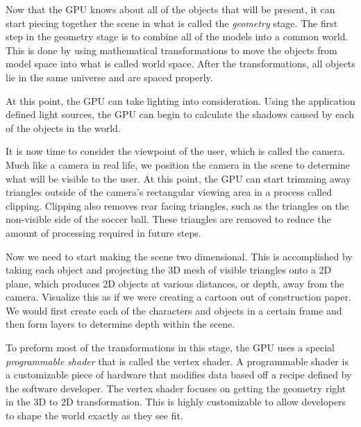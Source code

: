 \documentclass[12pt] {article}
\begin{document}
Now that the GPU knows about all of the objects that will be present, it can start piecing together the scene in what is called the \emph{geometry} stage. The first step in the geometry stage is to combine all of the models into a common world. This is done by using mathematical transformations to move the objects from model space into what is called world space. After the transformations, all objects lie in the same universe and are spaced properly. 

At this point, the GPU can take lighting into consideration. Using the application defined light sources, the GPU can begin to calculate the shadows caused by each of the objects in the world.

It is now time to consider the viewpoint of the user, which is called the camera. Much like a camera in real life, we position the camera in the scene to determine what will be visible to the user. At this point, the GPU can start trimming away triangles outside of the camera's rectangular viewing area in a process called clipping. Clipping also removes rear facing triangles, such as the triangles on the non-visible side of the soccer ball. These triangles are removed to reduce the amount of processing required in future steps.

Now we need to start making the scene two dimensional. This is accomplished by taking each object and projecting the 3D mesh of visible triangles onto a 2D plane, which produces 2D objects at various distances, or depth, away from the camera. Visualize this as if we were creating a cartoon out of construction paper. We would first create each of the characters and objects in a certain frame and then form layers to determine depth within the scene. 

To preform most of the transformations in this stage, the GPU uses a special \emph{programmable shader} that is called the vertex shader. A programmable shader is a customizable piece of hardware that modifies data based off a recipe defined by the software developer. The vertex shader focuses on getting the geometry right in the 3D to 2D transformation. This is highly customizable to allow developers to shape the world exactly as they see fit.
\end{document}
